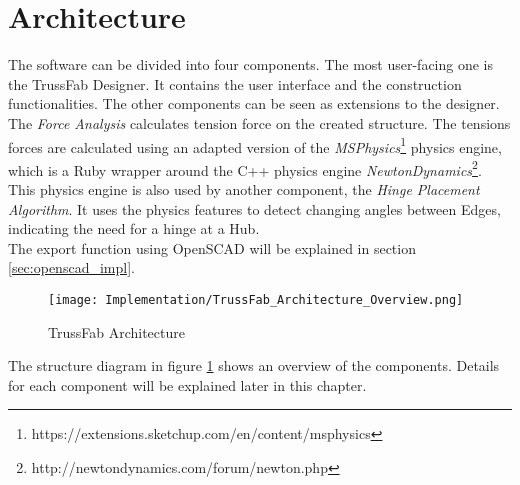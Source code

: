 \section{Architecture}
The software can be divided into four components. The most user-facing one is the TrussFab Designer. It contains the user interface and the construction functionalities. The other components can be seen as extensions to the designer. The \textit{Force Analysis} calculates tension force on the created structure. The tensions forces are calculated using an adapted version of the \textit{MSPhysics}\footnote{https://extensions.sketchup.com/en/content/msphysics} physics engine, which is a Ruby wrapper around the C++ physics engine \textit{NewtonDynamics}\footnote{http://newtondynamics.com/forum/newton.php}.\\
This physics engine is also used by another component, the \textit{Hinge Placement Algorithm}. It uses the physics features to detect changing angles between Edges, indicating the need for a hinge at a Hub.\\
The export function using OpenSCAD will be explained in section \ref{sec:openscad_impl}.
\begin{figure}[!h]
    \texttt{[image: Implementation/TrussFab\_Architecture\_Overview.png]}
    \centering
    \caption{TrussFab Architecture}
    \label{fig:architecture}
\end{figure}
The structure diagram in figure \ref{fig:architecture} shows an overview of the components. Details for each component will be explained later in this chapter.

